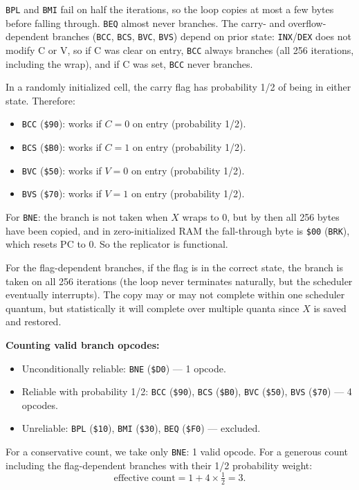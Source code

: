 \documentclass{article}
\newcommand{\hex}[1]{\texttt{\$#1}}
\newcommand{\opcode}[1]{\texttt{#1}}
\begin{document}
\opcode{BPL} and \opcode{BMI} fail on half the iterations, so the loop
copies at most a few bytes before falling through. \opcode{BEQ} almost
never branches. The carry- and overflow-dependent branches (\opcode{BCC},
\opcode{BCS}, \opcode{BVC}, \opcode{BVS}) depend on prior state:
\opcode{INX}/\opcode{DEX} does not modify C or V, so if C was clear on
entry, \opcode{BCC} always branches (all 256 iterations, including the
wrap), and if C was set, \opcode{BCC} never branches.

In a randomly initialized cell, the carry flag has probability 1/2 of
being in either state. Therefore:
\begin{itemize}
\item \opcode{BCC} (\hex{90}): works if $C=0$ on entry (probability 1/2).
\item \opcode{BCS} (\hex{B0}): works if $C=1$ on entry (probability 1/2).
\item \opcode{BVC} (\hex{50}): works if $V=0$ on entry (probability 1/2).
\item \opcode{BVS} (\hex{70}): works if $V=1$ on entry (probability 1/2).
\end{itemize}

For \opcode{BNE}: the branch is not taken when $X$ wraps to 0, but by
then all 256 bytes have been copied, and in zero-initialized RAM the
fall-through byte is \hex{00} (\opcode{BRK}), which resets PC to 0.
So the replicator is functional.

For the flag-dependent branches, if the flag is in the correct state,
the branch is taken on all 256 iterations (the loop never terminates
naturally, but the scheduler eventually interrupts). The copy may or
may not complete within one scheduler quantum, but statistically it
will complete over multiple quanta since $X$ is saved and restored.

\textbf{Counting valid branch opcodes:}
\begin{itemize}
\item Unconditionally reliable: \opcode{BNE} (\hex{D0}) --- 1 opcode.
\item Reliable with probability 1/2: \opcode{BCC} (\hex{90}),
  \opcode{BCS} (\hex{B0}), \opcode{BVC} (\hex{50}),
  \opcode{BVS} (\hex{70}) --- 4 opcodes.
\item Unreliable: \opcode{BPL} (\hex{10}), \opcode{BMI} (\hex{30}),
  \opcode{BEQ} (\hex{F0}) --- excluded.
\end{itemize}

For a conservative count, we take only \opcode{BNE}: 1 valid opcode.
For a generous count including the flag-dependent branches with their
1/2 probability weight:
\[
  \text{effective count} = 1 + 4 \times \tfrac{1}{2} = 3.
\]
\end{document}
